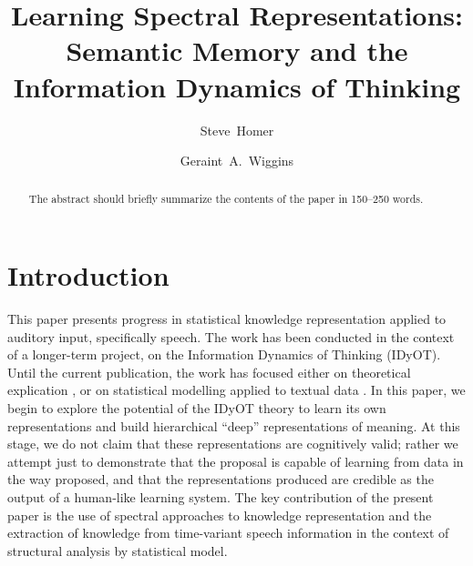 \documentclass[runningheads]{llncs}
\begin{document}
%
\title{Learning Spectral Representations:\\ Semantic Memory and the\\ Information Dynamics of Thinking}
%
%
\author{Steve~Homer \and
Geraint~A.~Wiggins}
%
%
%
\maketitle              %
%
\begin{abstract}
The abstract should briefly summarize the contents of the paper in
150--250 words.

\end{abstract}
%
%
%
\section{Introduction}
This paper presents progress in statistical knowledge representation applied to auditory input, specifically speech. The work has been conducted in the context of a longer-term project, on the Information Dynamics of Thinking (IDyOT). Until the current publication, the work has focused either on theoretical explication \cite{Wiggins12,WigginsForth15,ForthAgresEtAl16,vanderVeldeForthEtAl17,Wiggins18}, or on statistical modelling applied to textual data \cite{WigginsSanjekdar19}. In this paper, we begin to explore the potential of the IDyOT theory to learn its own representations and build hierarchical ``deep'' representations of meaning. At this stage, we do not claim that these representations are cognitively valid; rather we attempt just to demonstrate that the proposal is capable of learning from data in the way proposed, and that the representations produced are credible as the output of a human-like learning system. The key contribution of the present paper is the use of spectral approaches to knowledge representation and the extraction of knowledge from time-variant speech information in the context of structural analysis by statistical model.
\end{document}
